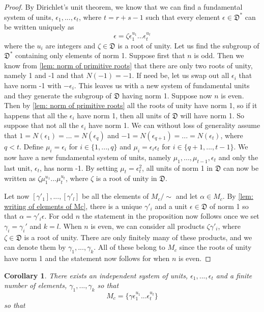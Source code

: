 \documentclass{article}
\newtheorem{corollary}{Corollary}[section]
\newcommand{\mfrak}[1]{\mathfrak{#1}}
\begin{document}
\begin{proof}
    By Dirichlet's unit theorem, we know that we can find a fundamental system of units, $\epsilon_1, ..., \epsilon_t$, where $t = r+s-1$ such that every element $\epsilon \in \mfrak D^*$ can be written uniquely as 
    $$\epsilon = \zeta \epsilon_1^{u_1} ... \epsilon_t^{u_t}$$
    where the $u_i$ are integers and $\zeta \in \mfrak D$ is a root of unity. Let us find the subgroup of $\mfrak D^*$ containing only elements of norm 1. Suppose first that $n$ is odd. Then we know from \cref{lem: norm of primitive roots} that there are only two roots of unity, namely 1 and -1 and that $N(-1) = -1$. If need be, let us swap out all $\epsilon_i$ that have norm -1 with $-\epsilon_i$. This leaves us with a new system of fundamental units and they generate the subgroup of $\mfrak D$ having norm 1. Suppose now $n$ is even. Then by \cref{lem: norm of primitive roots} all the roots of unity have norm 1, so if it happens that all the $\epsilon_i$ have norm 1, then all units of $\mfrak D$ will have norm 1. So suppose that not all the $\epsilon_i$ have norm 1. We can without loss of generality assume that $1 = N(\epsilon_1) = ... = N(\epsilon_q)$ and $-1 = N(\epsilon_{q+1}) = ... = N(\epsilon_t)$, where $q < t$. Define  
    $\mu_i = \epsilon_i$ for $i \in \{1, ..., q\}$ and $\mu_i = \epsilon_i \epsilon_t$ for $i \in \{q+1, ..., t-1\}$. We now have a new fundamental system of units, namely $\mu_1, ..., \mu_{t-1},\epsilon_t$ and only the last unit, $\epsilon_t$, has norm -1. By setting $\mu_t = \epsilon_t^2$, all units of norm 1 in $\mfrak D$ can now be written as $\zeta \mu_1^{u_1}...\mu_t^{u_t}$, where $\zeta$ is a root of unity in $\mfrak D$. 

    Let now $[\gamma'_1], ..., [\gamma'_l]$ be all the elements of $M_c / \sim$ and let $\alpha \in M_c$. By \cref{lem: writing of elements of Mc}, there is a unique $\gamma'_i$ and a unit $\epsilon \in \mfrak D$ of norm 1 so that $\alpha = \gamma'_i \epsilon$. For odd $n$ the statement in the proposition now follows once we set $\gamma_i = \gamma_i'$ and $k = l$. When $n$ is even, we can consider all products $\zeta \gamma'_i$, where $\zeta \in \mfrak D$ is a root of unity. There are only finitely many of these products, and we can denote them by $\gamma_1, ..., \gamma_k$. All of these belong to $M_c$ since the roots of unity have norm 1 and the statement now follows for when $n$ is even.
\end{proof}

\begin{corollary}
    There exists an independent system of units, $\epsilon_1, ..., \epsilon_t$ and a finite number of elements, $\gamma_1, ..., \gamma_k$ so that 
    $$M_c = \{ \gamma \epsilon_1^{u_1}...\epsilon_t^{u_t}\}$$
    so that
\end{corollary}
\end{document}
